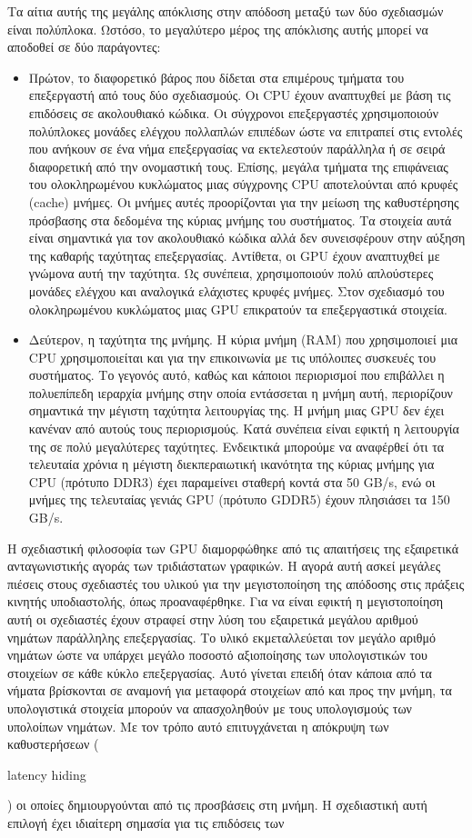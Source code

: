 Τα αίτια αυτής της μεγάλης απόκλισης στην απόδοση μεταξύ των δύο σχεδιασμών είναι πολύπλοκα. Ωστόσο, το μεγαλύτερο μέρος της απόκλισης αυτής μπορεί να αποδοθεί σε δύο παράγοντες:
\begin{itemize}
\item Πρώτον, το διαφορετικό βάρος που δίδεται στα επιμέρους τμήματα του επεξεργαστή από τους δύο σχεδιασμούς. Οι CPU έχουν αναπτυχθεί με βάση τις επιδόσεις σε ακολουθιακό κώδικα. Οι σύγχρονοι επεξεργαστές χρησιμοποιούν πολύπλοκες μονάδες ελέγχου πολλαπλών επιπέδων ώστε να επιτραπεί στις εντολές που ανήκουν σε ένα νήμα επεξεργασίας να εκτελεστούν παράλληλα ή σε σειρά διαφορετική από την ονομαστική τους. Επίσης, μεγάλα τμήματα της επιφάνειας του ολοκληρωμένου κυκλώματος μιας σύγχρονης CPU αποτελούνται από κρυφές (cache) μνήμες. Οι μνήμες αυτές προορίζονται για την μείωση της καθυστέρησης πρόσβασης στα δεδομένα της κύριας μνήμης του συστήματος. Τα στοιχεία αυτά είναι σημαντικά για τον ακολουθιακό κώδικα αλλά δεν συνεισφέρουν στην αύξηση της καθαρής ταχύτητας επεξεργασίας. Αντίθετα, οι GPU έχουν αναπτυχθεί με γνώμονα αυτή την ταχύτητα. Ως συνέπεια, χρησιμοποιούν πολύ απλούστερες μονάδες ελέγχου  και αναλογικά ελάχιστες κρυφές μνήμες. Στον σχεδιασμό του ολοκληρωμένου κυκλώματος μιας GPU επικρατούν τα 
επεξεργαστικά στοιχεία. 
\item Δεύτερον, η ταχύτητα της μνήμης. Η κύρια μνήμη (RAM) που χρησιμοποιεί μια CPU χρησιμοποιείται και για την επικοινωνία με τις υπόλοιπες συσκευές του συστήματος. Το γεγονός αυτό, καθώς και κάποιοι περιορισμοί που επιβάλλει η πολυεπίπεδη ιεραρχία μνήμης στην οποία εντάσσεται η μνήμη αυτή, περιορίζουν σημαντικά την μέγιστη ταχύτητα λειτουργίας της. Η μνήμη μιας GPU δεν έχει κανέναν από αυτούς τους περιορισμούς. Κατά συνέπεια είναι εφικτή η λειτουργία της σε πολύ μεγαλύτερες ταχύτητες. Ενδεικτικά μπορούμε να αναφέρθεί ότι τα τελευταία χρόνια η μέγιστη διεκπεραιωτική ικανότητα της κύριας μνήμης για CPU (πρότυπο DDR3) έχει παραμείνει σταθερή κοντά στα 50 GB/s, ενώ οι μνήμες της τελευταίας γενιάς GPU (πρότυπο GDDR5) έχουν πλησιάσει τα 150 GB/s.
\end{itemize}
Η σχεδιαστική φιλοσοφία των GPU διαμορφώθηκε από τις απαιτήσεις της εξαιρετικά ανταγωνιστικής αγοράς των τριδιάστατων γραφικών. Η αγορά αυτή ασκεί μεγάλες πιέσεις στους σχεδιαστές του υλικού για την μεγιστοποίηση της απόδοσης στις πράξεις κινητής υποδιαστολής, όπως προαναφέρθηκε. Για να είναι εφικτή η μεγιστοποίηση αυτή οι σχεδιαστές  έχουν στραφεί στην λύση του εξαιρετικά μεγάλου αριθμού νημάτων παράλληλης επεξεργασίας. Το υλικό εκμεταλλεύεται τον μεγάλο αριθμό νημάτων ώστε να υπάρχει μεγάλο ποσοστό αξιοποίησης των υπολογιστικών του στοιχείων σε κάθε κύκλο επεξεργασίας. Αυτό γίνεται επειδή όταν κάποια από τα νήματα βρίσκονται σε αναμονή για μεταφορά στοιχείων από και προς την μνήμη, τα υπολογιστικά στοιχεία μπορούν να απασχοληθούν με τους υπολογισμούς των υπολοίπων νημάτων. Με τον τρόπο αυτό επιτυγχάνεται η απόκρυψη των καθυστερήσεων (\begin{english}latency hiding\end{english}) οι οποίες δημιουργούνται από τις προσβάσεις στη μνήμη. Η σχεδιαστική αυτή επιλογή έχει ιδιαίτερη σημασία για τις επιδόσεις των 
